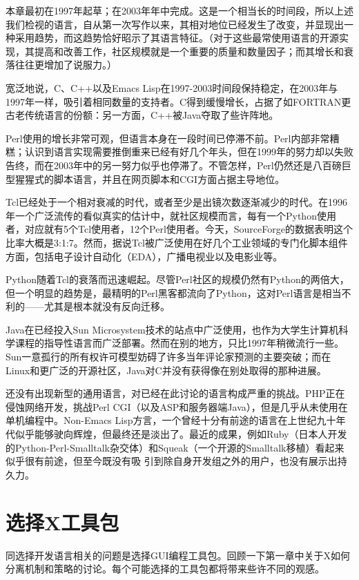 \documentclass[12pt,oneside]{book}
\begin{document}
\begin{common-format}
本章最初在1997年起草；在2003年年中完成。这是一个相当长的时间段，所以上述我们检视的语言，自从第一次写作以来，其相对地位已经发生了改变，并显现出一种采用趋势，而这趋势恰好昭示了其语言特征。（对于这些最常使用语言的开源实现，其提高和改善工作，社区规模就是一个重要的质量和数量因子；而其增长和衰落往往更增加了说服力。）

宽泛地说，C、C++以及Emacs Lisp在1997-2003时间段保持稳定，在2003年与1997年一样，吸引着相同数量的支持者。C得到缓慢增长，占据了如FORTRAN更古老传统语言的份额：另一方面，C++被Java夺取了些许阵地。

Perl使用的增长非常可观，但语言本身在一段时间已停滞不前。Perl内部非常糟糕；认识到语言实现需要推倒重来已经有好几个年头，但在1999年的努力却以失败告终，而在2003年中的另一努力似乎也停滞了。不管怎样，Perl仍然还是八百磅巨型猩猩式的脚本语言，并且在网页脚本和CGI方面占据主导地位。

Tcl已经处于一个相对衰减的时代，或者至少是出镜次数逐渐减少的时代。在1996年一个广泛流传的看似真实的估计中，就社区规模而言，每有一个Python使用者，对应就有5个Tcl使用者，12个Perl使用者。今天，SourceForge的数据表明这个比率大概是3:1:7。然而，据说Tcl被广泛使用在好几个工业领域的专门化脚本组件方面，包括电子设计自动化（EDA），广播电视业以及电影业等。

Python随着Tcl的衰落而迅速崛起。尽管Perl社区的规模仍然有Python的两倍大，但一个明显的趋势是，最精明的Perl黑客都流向了Python，这对Perl语言是相当不利的——尤其是根本就没有反向迁移。

Java在已经投入Sun Microsystem技术的站点中广泛使用，也作为大学生计算机科学课程的指导性语言而广泛部署。然而在别的地方，只比1997年稍微流行一些。Sun一意孤行的所有权许可模型妨碍了许多当年评论家预测的主要突破；而在Linux和更广泛的开源社区，Java对C并没有获得像在别处取得的那种进展。

还没有出现新型的通用语言，对已经在此讨论的语言构成严重的挑战。PHP正在侵蚀网络开发，挑战Perl CGI（以及ASP和服务器端Java），但是几乎从未使用在单机编程中。Non-Emacs Lisp方言，一个曾经十分有前途的语言在上世纪九十年代似乎能够驶向辉煌，但最终还是淡出了。最近的成果，例如Ruby（日本人开发的Python-Perl-Smalltalk杂交体）和Squeak（一个开源的Smalltalk移植）看起来似乎很有前途，但至今既没有吸
引到除自身开发组之外的用户，也没有展示出持久力。


\section{选择X工具包}
同选择开发语言相关的问题是选择GUI编程工具包。回顾一下第一章中关于X如何分离机制和策略的讨论。每个可能选择的工具包都将带来些许不同的观感。


\end{common-format}
\end{document}

